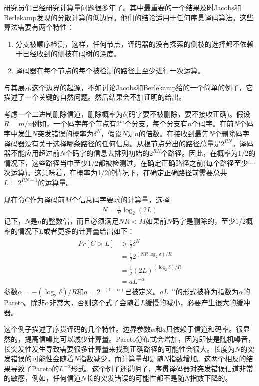 \documentclass[twoside,numberorder]{buptthesis}
\begin{document}
研究员们已经研究计算量问题很多年了。其中最重要的一个结果及时Jacobs和Berlekamp发现的分散计算的低边界。他们的结论适用于任何序贯译码算法。这些算法需要有两个特性：
\begin{enumerate}
  \item
    分支被顺序检测，这样，任何节点，译码器的没有探索的侧枝的选择都不依赖于已经收到的侧枝在码树的深度。
  \item 译码器在每个节点的每个被检测的路径上至少进行一次运算。
\end{enumerate}
与其展示这个边界的起源，不如讨论Jacobs和Berlekamp给的一个简单的例子，它描述了一个关键的自然问题。然后结果会不加证明的给出。


考虑一个二进制删除信道，删除概率为$\delta$(码字要不被删除，要不接收正确)。假设$R=m/n$例如，一个码字每个节点有$2^m$个分支，每个分支有$n$个码字。在前$N$个码字中发生$N$突发错误的概率为$\delta^N$，假设$N$是$n$的倍数。在接收到最先$N$个删除码字译码器没有关于选择哪条路径的任何信息。从根节点分出的路径总量是$2^{RN}$。译码器不能应用超过前$N$个码字的信息去排列初始的$2^{RN}$个路径。因此，在概率为1/2的情况下，这些路径当中至少1/2都被检测过，在确定正确路径之前(每个路径至少一次运算)。这意味着，在概率为1/2的情况下，在确定正确路径前需要总共$L=2^{RN-1}$的运算量。

现在令$C$作为译码前$M$个信息码字要求的计算量，选择
\begin{eqnarray}
  N=\frac{1}{R}\log_2(2L)
  \label{equ:13}
\end{eqnarray}
记下，$N$是$n$的整数倍，而且必须满足$NR<M$如果前$N$码字是删除的，至少1/2概率的情况下$L$或者更多的计算量给出如下：
\begin{eqnarray}
  \begin{array}{ll}
  Pr[C>L]&>\frac{1}{2}\delta^N\\
  &=\frac{1}{2}2^{(NR\log_2\delta)/R}\\
  &=\frac{1}{2}(2L)^{(\log_2\delta)/R}\\
  &=aL^{-\alpha}
\end{array}
  \label{equ:14}
\end{eqnarray}
参数$\alpha=-(\log_2\delta)/R$和$a=2^{-(1+\alpha)}$已被定义。$aL^{-\alpha}$的形式被称为指数为$\alpha$的Pareto。除非$\alpha$非常大，否则这个式子会随着$L$缓慢的减小，必要产生很大的缓冲器。

这个例子描述了序贯译码的几个特性。边界参数$\alpha$和$a$只依赖于信道和码率。很显然的，提高信噪比可以减少计算量。Pareto分布式会增加，因为即使是随机噪音，长突发性发生导致需要很多计算量来找到正确路径的可能性会很大。长度为$N$的突发错误的可能性会随着$N$指数减少，而计算量却是随$N$指数增加。这两个相反的结果导致了Pareto的$L^{-\alpha}$形式。这个例子还说明了，序贯译码器对突发错误信道非常的敏感，例如，任何信道$N$长的突发错误的可能性都不是随$N$指数下降的。
\end{document}
